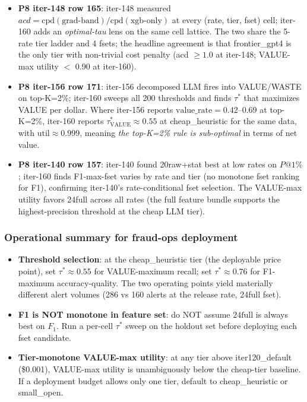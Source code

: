 \begin{itemize}
\item \textbf{P8 iter-148 row 165}: iter-148 measured
$acd = \mathrm{cpd}(\mathrm{grad\text{-}band})/\mathrm{cpd}(\mathrm{xgb\text{-}only})$
at every (rate, tier, fset) cell; iter-160 adds an \emph{optimal-tau}
lens on the same cell lattice. The two share the 5-rate tier ladder
and 4 fsets; the headline agreement is that frontier\_gpt4 is the only
tier with non-trivial cost penalty (acd $\geq 1.0$ at iter-148; VALUE-max
utility $<$ 0.90 at iter-160).
\item \textbf{P8 iter-156 row 171}: iter-156 decomposed LLM fires into
VALUE/WASTE on top-K=2\%; iter-160 sweeps all 200 thresholds and finds
$\tau^*$ that maximizes VALUE per dollar. Where iter-156 reports
$\mathrm{value\_rate} = 0.42$--$0.69$ at top-K=2\%, iter-160 reports
$\tau^*_{\mathrm{VALUE}} \approx 0.55$ at cheap\_heuristic for the
same data, with $\mathrm{util} \approx 0.999$, meaning \emph{the
top-K=2\% rule is sub-optimal} in terms of net value.
\item \textbf{P8 iter-140 row 157}: iter-140 found 20raw+stat best at
low rates on $P@1\%$; iter-160 finds F1-max-fset varies by rate and
tier (no monotone fset ranking for F1), confirming iter-140's
rate-conditional fset selection. The VALUE-max utility favors 24full
across all rates (the full feature bundle supports the highest-precision
threshold at the cheap LLM tier).
\end{itemize}

\subsubsection{Operational summary for fraud-ops deployment}

\begin{itemize}
\item \textbf{Threshold selection}: at the cheap\_heuristic tier (the
deployable price point), set $\tau^* \approx 0.55$ for VALUE-maximum
recall; set $\tau^* \approx 0.76$ for F1-maximum accuracy-quality.
The two operating points yield materially different alert volumes
(286 vs 160 alerts at the release rate, 24full fset).
\item \textbf{F1 is NOT monotone in feature set}: do NOT assume
$\mathrm{24full}$ is always best on $F_1$. Run a per-cell $\tau^*$
sweep on the holdout set before deploying each fset candidate.
\item \textbf{Tier-monotone VALUE-max utility}: at any tier above
iter120\_default (\$0.001), VALUE-max utility is unambiguously below
the cheap-tier baseline. If a deployment budget allows only one tier,
default to cheap\_heuristic or small\_open.
\end{itemize}

